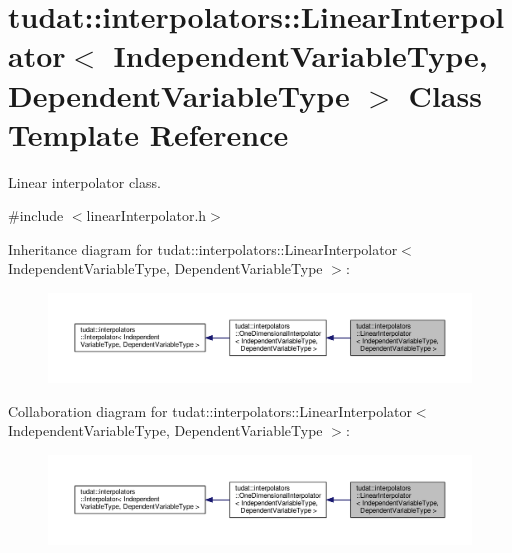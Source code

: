 \hypertarget{classtudat_1_1interpolators_1_1LinearInterpolator}{}\section{tudat\+:\+:interpolators\+:\+:Linear\+Interpolator$<$ Independent\+Variable\+Type, Dependent\+Variable\+Type $>$ Class Template Reference}
\label{classtudat_1_1interpolators_1_1LinearInterpolator}


Linear interpolator class.  




{\ttfamily \#include $<$linear\+Interpolator.\+h$>$}



Inheritance diagram for tudat\+:\+:interpolators\+:\+:Linear\+Interpolator$<$ Independent\+Variable\+Type, Dependent\+Variable\+Type $>$\+:
\nopagebreak
\begin{figure}[H]
\begin{center}
\leavevmode
\includegraphics[width=350pt]{classtudat_1_1interpolators_1_1LinearInterpolator__inherit__graph}
\end{center}
\end{figure}


Collaboration diagram for tudat\+:\+:interpolators\+:\+:Linear\+Interpolator$<$ Independent\+Variable\+Type, Dependent\+Variable\+Type $>$\+:
\nopagebreak
\begin{figure}[H]
\begin{center}
\leavevmode
\includegraphics[width=350pt]{classtudat_1_1interpolators_1_1LinearInterpolator__coll__graph}
\end{center}
\end{figure}
